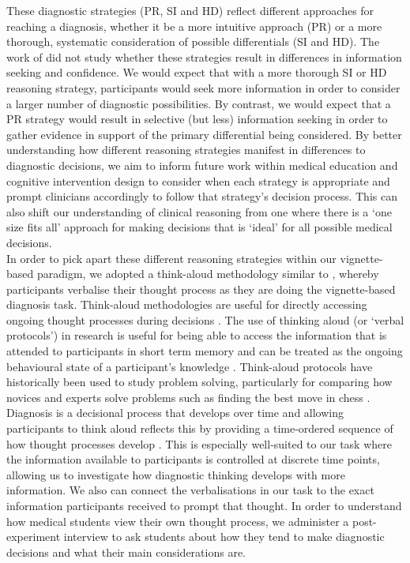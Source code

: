 \documentclass[a4paper, nobind]{templates/ociamthesis}
\begin{document}
\hfill\break
These diagnostic strategies (PR, SI and HD) reflect different approaches for reaching a diagnosis, whether it be a more intuitive approach (PR) or a more thorough, systematic consideration of possible differentials (SI and HD). The work of \textcite{coderre_diagnostic_2003} did not study whether these strategies result in differences in information seeking and confidence. We would expect that with a more thorough SI or HD reasoning strategy, participants would seek more information in order to consider a larger number of diagnostic possibilities. By contrast, we would expect that a PR strategy would result in selective (but less) information seeking in order to gather evidence in support of the primary differential being considered. By better understanding how different reasoning strategies manifest in differences to diagnostic decisions, we aim to inform future work within medical education and cognitive intervention design to consider when each strategy is appropriate and prompt clinicians accordingly to follow that strategy's decision process. This can also shift our understanding of clinical reasoning from one where there is a `one size fits all' approach for making decisions that is `ideal' for all possible medical decisions.\\

In order to pick apart these different reasoning strategies within our vignette-based paradigm, we adopted a think-aloud methodology similar to \textcite{coderre_diagnostic_2003}, whereby participants verbalise their thought process as they are doing the vignette-based diagnosis task. Think-aloud methodologies are useful for directly accessing ongoing thought processes during decisions \autocite{someren_think_1994}. The use of thinking aloud (or `verbal protocols') in research is useful for being able to access the information that is attended to participants in short term memory \autocite{payne_thinking_1994} and can be treated as the ongoing behavioural state of a participant's knowledge \autocite{newell_human_1972}. Think-aloud protocols have historically been used to study problem solving, particularly for comparing how novices and experts solve problems such as finding the best move in chess \autocite{groot_thought_1978}. Diagnosis is a decisional process that develops over time and allowing participants to think aloud reflects this by providing a time-ordered sequence of how thought processes develop \autocite{payne_thinking_1994}. This is especially well-suited to our task where the information available to participants is controlled at discrete time points, allowing us to investigate how diagnostic thinking develops with more information. We also can connect the verbalisations in our task to the exact information participants received to prompt that thought. In order to understand how medical students view their own thought process, we administer a post-experiment interview to ask students about how they tend to make diagnostic decisions and what their main considerations are.\\
\end{document}
